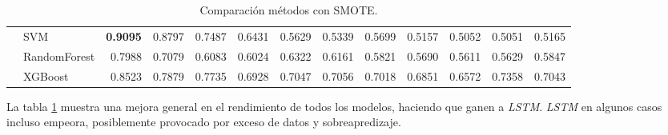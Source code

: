 \begin{table}[h]
\begin{adjustbox}{max width=15cm}
\begin{tabular}{|c|l|r|r|r|r|r|r|r|r|r|r|r|}
	& SVM &  \textbf{0.9095} &  0.8797 &  0.7487 &  0.6431 &  0.5629 &  0.5339 &  0.5699 &  0.5157 &  0.5052 &  0.5051 &  0.5165 \\
	& RandomForest &  0.7988 &  0.7079 &  0.6083 &  0.6024 &  0.6322 &  0.6161 &  0.5821 &  0.5690 &  0.5611 &  0.5629 &  0.5847 \\
	& XGBoost &  0.8523 &  0.7879 &  0.7735 &  0.6928 &  0.7047 &  0.7056 &  0.7018 &  0.6851 &  0.6572 &  0.7358 &  0.7043 \\
	\hline
\end{tabular}
\end{adjustbox}
\caption{Comparación métodos con SMOTE.}
\label{tab:all_comp_smote}
\end{table}

La tabla \ref{tab:all_comp_smote} muestra una mejora general en el rendimiento de todos los modelos, haciendo que ganen a \textit{LSTM}. \textit{LSTM} en algunos casos incluso empeora, posiblemente provocado por exceso de datos y sobreapredizaje.\newline

